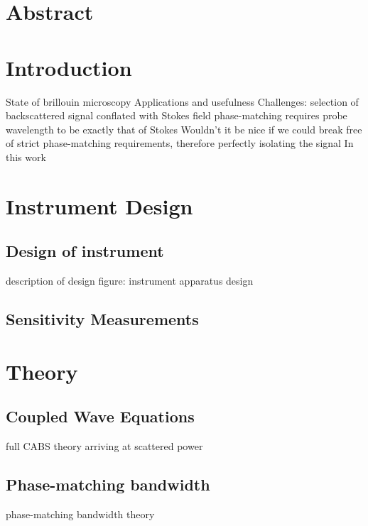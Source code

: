 \section{Abstract}
\label{sec:CABS:Abstract}
\lipsum[1]

\section{Introduction}
\label{sec:CABS:Introduction}
\lipsum[1]
State of brillouin microscopy
Applications and usefulness
Challenges: selection of backscattered signal
  conflated with Stokes field
  phase-matching requires probe wavelength to be exactly that of Stokes
Wouldn't it be nice if we could break free of strict phase-matching requirements, therefore perfectly isolating the signal
In this work

\section{Instrument Design} %
\label{sec:CABS:Design}
\lipsum[1]

  \subsection{Design of instrument}
  \label{subsec:CABS:Design:Design}
  \lipsum[1]
  description of design
  figure: instrument
    apparatus design

  \subsection{Sensitivity Measurements}
  \label{subsec:CABS:Design:Sensitivity}
  \lipsum[1]

\section{Theory}
\label{sec:CABS:Theory}
\lipsum[1]

  \subsection{Coupled Wave Equations}
  \label{subsec:CABS:Theory:Coupled-Wave}
  \lipsum[1]
  full CABS theory arriving at scattered power

  \subsection{Phase-matching bandwidth}
  \label{subsec:CABS:Theory:Phase-Matching}
  \lipsum[1]
  phase-matching bandwidth theory

